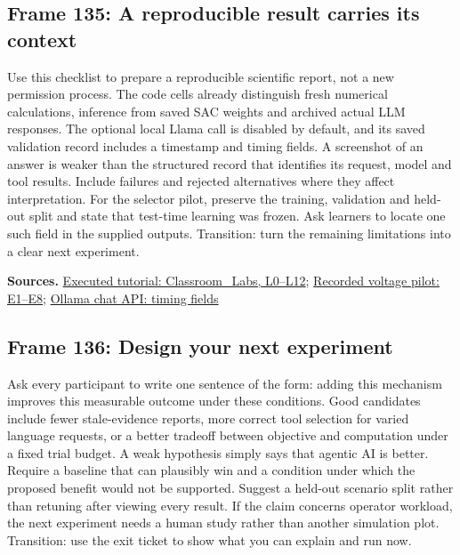 \documentclass[11pt]{article}
\begin{document}
\subsection*{Frame 135: A reproducible result carries its context}
Use this checklist to prepare a reproducible scientific report, not a new permission process. The code cells already distinguish fresh numerical calculations, inference from saved SAC weights and archived actual LLM responses. The optional local Llama call is disabled by default, and its saved validation record includes a timestamp and timing fields. A screenshot of an answer is weaker than the structured record that identifies its request, model and tool results. Include failures and rejected alternatives where they affect interpretation. For the selector pilot, preserve the training, validation and held-out split and state that test-time learning was frozen. Ask learners to locate one such field in the supplied outputs. Transition: turn the remaining limitations into a clear next experiment.\par
\par\nopagebreak\begin{minipage}{\linewidth}{\footnotesize\color{slate}\textbf{Sources.} \href{../Classroom_Labs.html}{Executed tutorial: Classroom\_Labs, L0--L12}; \href{../LLM_Response_Selection.html}{Recorded voltage pilot: E1--E8}; \href{https://docs.ollama.com/api/chat}{Ollama chat API: timing fields}\par}\end{minipage}\par\medskip
\subsection*{Frame 136: Design your next experiment}
Ask every participant to write one sentence of the form: adding this mechanism improves this measurable outcome under these conditions. Good candidates include fewer stale-evidence reports, more correct tool selection for varied language requests, or a better tradeoff between objective and computation under a fixed trial budget. A weak hypothesis simply says that agentic AI is better. Require a baseline that can plausibly win and a condition under which the proposed benefit would not be supported. Suggest a held-out scenario split rather than retuning after viewing every result. If the claim concerns operator workload, the next experiment needs a human study rather than another simulation plot. Transition: use the exit ticket to show what you can explain and run now.\par
\end{document}
